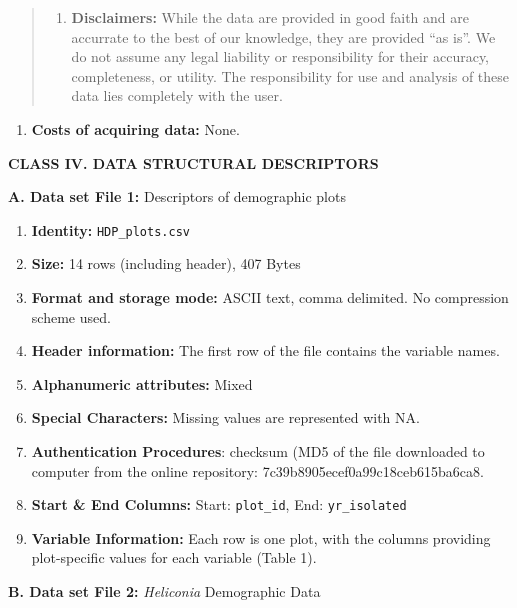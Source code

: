 \documentclass[
  man, donotrepeattitle,floatsintext]{apa6}
\providecommand{\tightlist}{%
  \setlength{\itemsep}{0pt}\setlength{\parskip}{0pt}}
\begin{document}
\begin{quote}
\begin{enumerate}
\def\labelenumi{\alph{enumi}.}
\setcounter{enumi}{2}
\tightlist
\item
  \textbf{Disclaimers:} While the data are provided in good faith and are accurrate to the best of our knowledge, they are provided ``as is''. We do not assume any legal liability or responsibility for their accuracy, completeness, or utility. The responsibility for use and analysis of these data lies completely with the user.
\end{enumerate}
\end{quote}

\begin{enumerate}
\def\labelenumi{\arabic{enumi}.}
\setcounter{enumi}{4}
\tightlist
\item
  \textbf{Costs of acquiring data:} None.
\end{enumerate}

\noindent  
\textbf{CLASS IV. DATA STRUCTURAL DESCRIPTORS}

\noindent  
\textbf{A. Data set File 1:} Descriptors of demographic plots

\begin{enumerate}
\def\labelenumi{\arabic{enumi}.}
\item
  \textbf{Identity:} \texttt{HDP\_plots.csv}
\item
  \textbf{Size:} 14 rows (including header), 407 Bytes
\item
  \textbf{Format and storage mode:} ASCII text, comma delimited. No
  compression scheme used.
\item
  \textbf{Header information:} The first row of the file contains the variable names.
\item
  \textbf{Alphanumeric attributes:} Mixed
\item
  \textbf{Special Characters:} Missing values are represented with NA.
\item
  \textbf{Authentication Procedures}: checksum (MD5 of the file downloaded to computer from the online repository: 7c39b8905ecef0a99c18ceb615ba6ca8.
\item
  \textbf{Start \& End Columns:} Start: \texttt{plot\_id}, End: \texttt{yr\_isolated}
\item
  \textbf{Variable Information:} Each row is one plot, with the columns providing plot-specific values for each variable (Table 1).
\end{enumerate}

\noindent 
\textbf{B. Data set File 2:} \emph{Heliconia} Demographic Data
\end{document}
